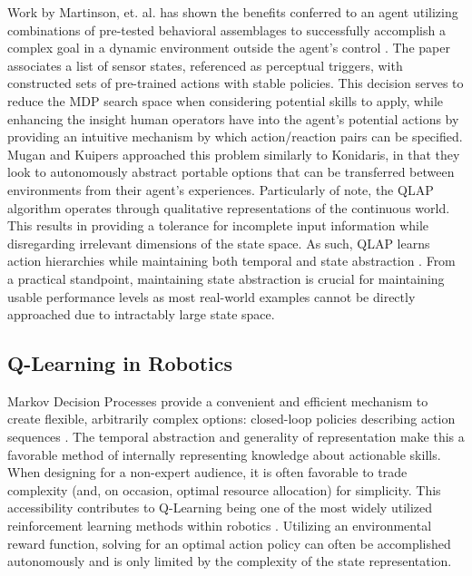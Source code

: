\documentclass[letterpaper]{article}
\begin{document}
Work by Martinson, et. al. has shown the benefits conferred to an agent utilizing combinations of pre-tested behavioral assemblages to successfully accomplish a complex goal in a dynamic environment outside the agent's control \cite{QLBehaviorSelection}. The paper associates a list of sensor states, referenced as perceptual triggers, with constructed sets of pre-trained actions with stable policies. This decision serves to reduce the MDP search space when considering potential skills to apply, while enhancing the insight human operators have into the agent's potential actions by providing an intuitive mechanism by which action/reaction pairs can be specified. Mugan and Kuipers approached this problem similarly to Konidaris, in that they look to autonomously abstract portable options that can be transferred between environments from their agent's experiences. Particularly of note, the QLAP algorithm operates through qualitative representations of the continuous world. This results in providing a tolerance for incomplete input information while disregarding irrelevant dimensions of the state space. As such, QLAP learns action hierarchies while maintaining both temporal and state abstraction \cite{AutoHierarchyLearning}. From a practical standpoint, maintaining state abstraction is crucial for maintaining usable performance levels as most real-world examples cannot be directly approached due to intractably large state space.

\subsection{Q-Learning in Robotics}
Markov Decision Processes provide a convenient and efficient mechanism to create flexible, arbitrarily complex options: closed-loop policies describing action sequences \cite{SuttonMDP}. The temporal abstraction and generality of representation make this a favorable method of internally representing knowledge about actionable skills. When designing for a non-expert audience, it is often favorable to trade complexity (and, on occasion, optimal resource allocation) for simplicity. This accessibility contributes to Q-Learning being one of the most widely utilized reinforcement learning methods within robotics \cite{QLearningWatkins}. Utilizing an environmental reward function, solving for an optimal action policy can often be accomplished autonomously and is only limited by the complexity of the state representation.
\end{document}
